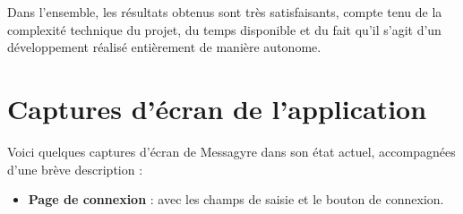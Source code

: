 \documentclass[12pt]{report}
\begin{document}
Dans l’ensemble, les résultats obtenus sont très satisfaisants, compte tenu de la complexité technique du projet, du temps disponible et du fait qu’il s’agit d’un développement réalisé entièrement de manière autonome.

\section{Captures d’écran de l’application}

Voici quelques captures d’écran de Messagyre dans son état actuel, accompagnées d’une brève description :

\begin{itemize}
	
	\item \textbf{Page de connexion} : avec les champs de saisie et le bouton de connexion.
	

\end{itemize}
\end{document}
